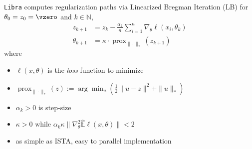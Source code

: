 \documentclass[slidestop,compress,9pt,epsfig,color]{beamer}
\providecommand{\NN}{\mathbb{N}}
\providecommand{\E}{\mathbb{E}}
\theoremstyle{example}
\providecommand{\subitem}{\\ \textcolor{yellow}{$\bullet\ $}}
\DeclareMathOperator{\prox}{prox}
\begin{document}
\begin{frame}{{\tt{Libra}} computes regularization paths via Linearized Bregman Iteration (LB)}
for $\theta_0=z_0=\vzero$ and $k\in \NN$,
\begin{subequations}
\begin{align}
z_{k+1} & = z_k - \frac{ \alpha_k }{n} \sum_{i=1}^n \nabla_{\theta} \ell (x_i,\theta_k)\\
 \theta_{k+1} & = \kappa \cdot \prox_{\|\cdot\|_\ast}(z_{k+1})
\end{align}
\end{subequations}
where
\begin{itemize}
\item $\ell (x,\theta)$ is the \emph{loss} function to minimize
\item $\prox_{\|\cdot\|_\ast}(z) := \arg\min_u \left( \frac{1}{2}\| u - z\|^2 + \|u\|_\ast \right )$ 
\item $\alpha_k>0$ is step-size 
\item $\kappa>0$ while $\alpha_k \kappa \|\nabla^2_\theta\hat{\E} \ell (x,\theta)\|<2$
\item as simple as ISTA, easy to parallel implementation
\end{itemize}
\end{frame}



\end{document}
